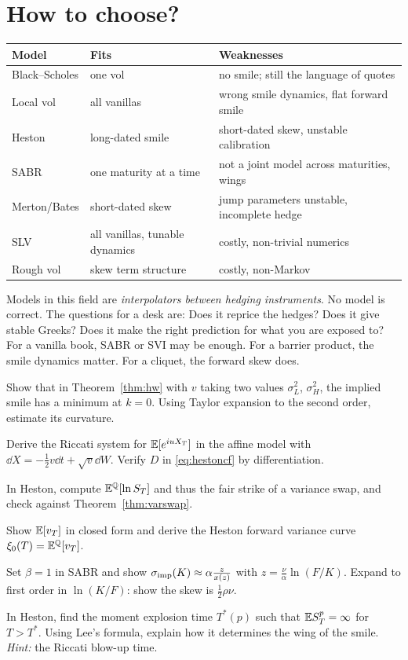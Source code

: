 \section{How to choose?}

\begin{center}
\small
\begin{tabular}{lll}
\toprule
Model & Fits & Weaknesses\\
\midrule
Black--Scholes & one vol & no smile; still the language of quotes\\
Local vol & all vanillas & wrong smile dynamics, flat forward smile\\
Heston & long-dated smile & short-dated skew, unstable calibration\\
SABR & one maturity at a time & not a joint model across maturities, wings\\
Merton/Bates & short-dated skew & jump parameters unstable, incomplete hedge\\
SLV & all vanillas, tunable dynamics & costly, non-trivial numerics\\
Rough vol & skew term structure & costly, non-Markov\\
\bottomrule
\end{tabular}
\end{center}

\begin{intuition}
Models in this field are \emph{interpolators between hedging instruments}. No model is correct. The questions for a desk are: Does it reprice the hedges? Does it give stable Greeks? Does it make the right prediction for what you are exposed to? For a vanilla book, SABR or SVI may be enough. For a barrier product, the smile dynamics matter. For a cliquet, the forward skew does.
\end{intuition}

\begin{exercises}
\item Show that in Theorem~\ref{thm:hw} with $v$ taking two values $\sigma_L^2$, $\sigma_H^2$, the implied smile has a minimum at $k=0$. Using Taylor expansion to the second order, estimate its curvature.
\item Derive the Riccati system for $\mathbb{E}[e^{iuX_T}]$ in the affine model with $\dd X=-\tfrac12v\dd t+\sqrt v\dd W$. Verify $D$ in \eqref{eq:hestoncf} by differentiation.
\item In Heston, compute $\mathbb{E}^{\mathbb{Q}}[\ln S_T]$ and thus the fair strike of a variance swap, and check against Theorem~\ref{thm:varswap}.
\item Show $\mathbb{E}[v_T]$ in closed form and derive the Heston forward variance curve $\xi_0(T)=\mathbb{E}^{\mathbb{Q}}[v_T]$.
\item Set $\beta=1$ in SABR and show $\sigma_{\rm imp}(K)\approx\alpha\frac{z}{x(z)}$ with $z=\frac\nu\alpha\ln(F/K)$. Expand to first order in $\ln(K/F)$: show the skew is $\tfrac12\rho\nu$.
\item In Heston, find the moment explosion time $T^*(p)$ such that $\mathbb{E} S_T^{p}=\infty$ for $T>T^*$. Using Lee's formula, explain how it determines the wing of the smile. \emph{Hint:} the Riccati blow-up time.
\end{exercises}

